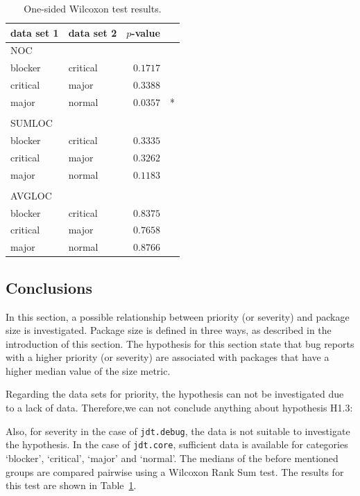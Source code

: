 \begin{table}[!ht]\footnotesize
	\centering
	\begin{tabular}{llrl}
		\toprule
		data set 1 & data set 2 & $p$-value & \\
		\midrule
		NOC \\  
		\midrule
		blocker & critical & $0.1717$ & \\
		critical & major & $0.3388$ & \\
		major & normal & $0.0357$ & * \\\\
		\midrule
		SUMLOC \\  
		\midrule
		blocker & critical & $0.3335$ & \\
		critical & major & $0.3262$ & \\
		major & normal & $0.1183$ & \\\\
		\midrule
		AVGLOC \\  
		\midrule
		blocker & critical & $0.8375$ & \\
		critical & major & $0.7658$ & \\
		major & normal & $0.8766$ & \\
		\bottomrule
	\end{tabular} 
	\caption{One-sided Wilcoxon test results.}
	\label{tab:wilcoxon-package-sevcore}
\end{table}

\subsection{Conclusions} %
In this section, a possible relationship between priority (or severity) and package size is investigated. Package size is defined in three ways, as described in the introduction of this section. The hypothesis for this section state that bug reports with a higher priority (or severity) are associated with packages that have a higher median value of the size metric.

Regarding the data sets for priority, the hypothesis can not be investigated due to a lack of data. Therefore,we can not conclude anything about hypothesis H1.3:

\vspace{\baselineskip}
\hypac{}
\vspace{\baselineskip}

\noindent
Also, for severity in the case of \texttt{jdt.debug}, the data is not suitable to investigate the hypothesis. In the case of \texttt{jdt.core}, sufficient data is available for categories `blocker', `critical', `major' and `normal'. The medians of the before mentioned groups are compared pairwise using a Wilcoxon Rank Sum test. The results for this test are shown in Table~\ref{tab:wilcoxon-package-sevcore}. 

